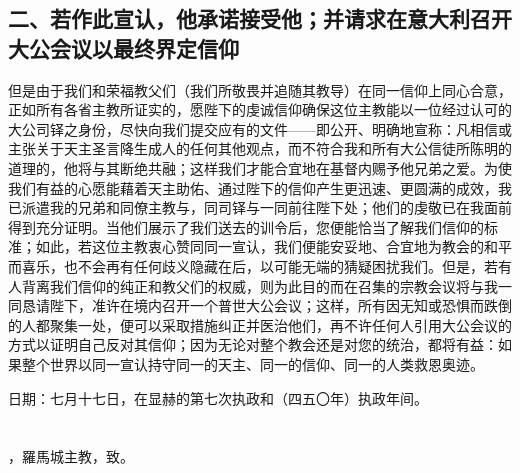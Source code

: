 
\subsection{二、若作此宣认，他承诺接受他；并请求在意大利召开大公会议以最终界定信仰}

但是由于我们和荣福教父们（我们所敬畏并追随其教导）在同一信仰上同心合意，正如所有各省主教所证实的，愿陛下的虔诚信仰确保这位主教能以一位经过认可的大公司铎之身份，尽快向我们提交应有的文件——即公开、明确地宣称：凡相信或主张关于天主圣言降生成人的任何其他观点，而不符合我和所有大公信徒所陈明的道理的，他将与其断绝共融；这样我们才能合宜地在基督内赐予他兄弟之爱。为使我们有益的心愿能藉着天主助佑、通过陛下的信仰产生更迅速、更圆满的成效，我已派遣我的兄弟和同僚主教与，同司铎与一同前往陛下处；他们的虔敬已在我面前得到充分证明。当他们展示了我们送去的训令后，您便能恰当了解我们信仰的标准；如此，若这位主教衷心赞同同一宣认，我们便能安妥地、合宜地为教会的和平而喜乐，也不会再有任何歧义隐藏在后，以可能无端的猜疑困扰我们。但是，若有人背离我们信仰的纯正和教父们的权威，则为此目的而在召集的宗教会议将与我一同恳请陛下，准许在境内召开一个普世大公会议；这样，所有因无知或恐惧而跌倒的人都聚集一处，便可以采取措施纠正并医治他们，再不许任何人引用大公会议的方式以证明自己反对其信仰；因为无论对整个教会还是对您的统治，都将有益：如果整个世界以同一宣认持守同一的天主、同一的信仰、同一的人类救恩奥迹。\par

日期：七月十七日，在显赫的第七次执政和（四五〇年）执政年间。\par



\section{}

，羅馬城主教，致。\par

